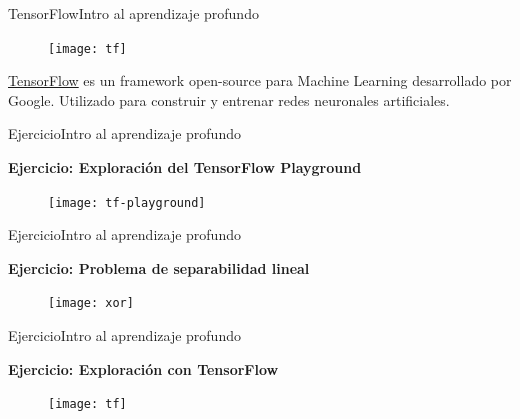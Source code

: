 \documentclass[10pt,border=3pt,tikz]{beamer}
\begin{document}
    \begin{frame}{TensorFlow}{Intro al aprendizaje profundo}
        \begin{center}
            \begin{figure}
                \centering
                \texttt{[image: tf]}
            \end{figure}
            \colorbox{blue!10}{\href{https://www.tensorflow.org/}{TensorFlow}} es un framework open-source para Machine Learning desarrollado por Google. Utilizado para construir y entrenar redes neuronales artificiales.
        \end{center}
    \end{frame}
    
    \begin{frame}{Ejercicio}{Intro al aprendizaje profundo}
        \begin{center}
            {\Large \textbf{Ejercicio: Exploración del TensorFlow Playground}}
        \end{center}
        \begin{figure}
            \centering
            \texttt{[image: tf-playground]}
        \end{figure}
    \end{frame}
    
    \begin{frame}{Ejercicio}{Intro al aprendizaje profundo}
        \begin{center}
            {\Large \textbf{Ejercicio: Problema de separabilidad lineal}}
        \end{center}
        \begin{figure}
            \centering
            \texttt{[image: xor]}
        \end{figure}
    \end{frame}
    
    \begin{frame}{Ejercicio}{Intro al aprendizaje profundo}
        \begin{center}
            {\Large \textbf{Ejercicio: Exploración con TensorFlow}}
        \end{center}
        \begin{figure}
            \centering
            \texttt{[image: tf]}
        \end{figure}
    \end{frame}
    
\end{document}
